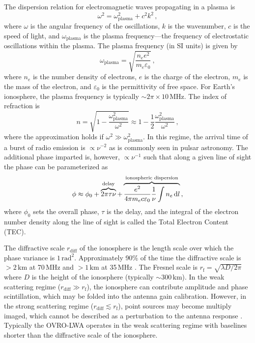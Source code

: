 \begin{bibunit}
The dispersion relation for electromagnetic waves propagating in a plasma is
\begin{equation}
    \omega^2 = \omega_\text{plasma}^2 + c^2 k^2\,,
\end{equation}
where $\omega$ is the angular frequency of the oscillations, $k$ is the wavenumber, $c$ is the speed
of light, and $\omega_\text{plasma}$ is the plasma frequency---the frequency of electrostatic
oscillations within the plasma. The plasma frequency (in SI units) is given by
\begin{equation}
    \omega_\text{plasma} = \sqrt{\frac{n_e e^2}{m_e \varepsilon_0}}\,,
\end{equation}
where $n_e$ is the number density of electrons, $e$ is the charge of the electron, $m_e$ is the mass
of the electron, and $\varepsilon_0$ is the permittivity of free space.  For Earth's ionosphere, the
plasma frequency is typically $\sim 2\pi \times 10\,\text{MHz}$.  The index of refraction is
\begin{equation}
    n = \sqrt{1 - \frac{\omega_\text{plasma}^2}{\omega^2}}
      \approx 1 - \frac{1}{2}\frac{\omega_\text{plasma}^2}{\omega^2}\,,
\end{equation}
where the approximation holds if $\omega^2 \gg \omega_\text{plasma}^2$. In this regime, the arrival
time of a burst of radio emission is $\propto \nu^{-2}$ as is commonly seen in pulsar astronomy.
The additional phase imparted is, however, $\propto \nu^{-1}$ such that along a given line of sight
the phase can be parameterized as
\begin{equation}
    \phi \approx \phi_0 + \overbrace{2\pi\tau\nu}^\text{delay}
    + \overbrace{\frac{e^2}{4\pi m_e c \varepsilon_0}
        \frac{1}{\nu}\int n_e\,{\textrm d} l}^\text{ionospheric dispersion}\,,
\end{equation}
where $\phi_0$ sets the overall phase, $\tau$ is the delay, and the integral of the electron number
density along the line of sight is called the Total Electron Content (TEC).

The diffractive scale $r_\text{diff}$ of the ionosphere is the length scale over which the phase
variance is $1\,\text{rad}^2$. Approximately 90\% of the time the diffractive scale is
$>2\,\text{km}$ at 70\,MHz and $>1\,\text{km}$ at 35\,MHz \citep{2016RaSc...51..927M}.  The Fresnel
scale is $r_\text{f} = \sqrt{\lambda D / 2\pi}$ where $D$ is the height of the ionosphere (typically
$\sim 300\,\text{km}$). In the weak scattering regime ($r_\text{diff} \gg r_\text{f}$), the
ionosphere can contribute amplitude and phase scintillation, which may be folded into the antenna
gain calibration.  However, in the strong scattering regime ($r_\text{diff} \lesssim r_\text{f}$),
point sources may become multiply imaged, which cannot be described as a perturbation to the antenna
response \citep{2015MNRAS.453..925V}. Typically the OVRO-LWA operates in the weak scattering regime
with baselines shorter than the diffractive scale of the ionosphere.


\end{bibunit}
